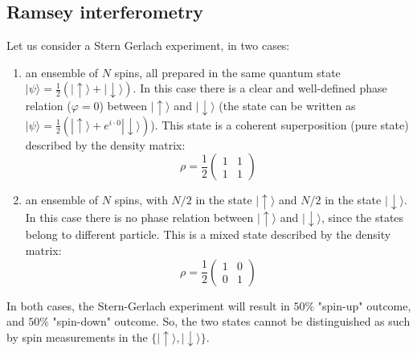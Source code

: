 \documentclass[a4paper,11pt]{article}
\newcommand{\ket}[1]{| #1 \rangle}
\begin{document}
\subsection {Ramsey interferometry}
Let us consider a Stern Gerlach experiment, in two cases:
\begin{enumerate}
    \item an ensemble of $N$ spins, all prepared in the same quantum state $\ket{\psi} = \frac{1}{2} (\ket{\uparrow}+\ket{\downarrow})$. In this case there is a clear and well-defined phase relation ($\varphi = 0$) between $\ket{\uparrow}$ and $\ket{\downarrow}$ (the state can be written as $\ket{\psi} = \frac{1}{2} (\ket{\uparrow}+ e^{i \cdot 0}\ket{\downarrow})$). This state is a coherent superposition (pure state) described by the density matrix:
    \begin{equation}
        \rho = \frac{1}{2}\left(\begin{array}{cc}
1 & 1\\
1 & 1\end{array} \right)
    \end{equation}    
    \item an ensemble of $N$ spins, with $N/2$ in the state $\ket{\uparrow}$ and $N/2$ in the state $\ket{\downarrow}$. In this case there is no phase relation between $\ket{\uparrow}$ and $\ket{\downarrow}$, since the states belong to different particle. This is a mixed state described by the density matrix:
    \begin{equation}
        \rho = \frac{1}{2}\left(\begin{array}{cc}
1 & 0\\
0 & 1\end{array} \right)
    \end{equation}    
\end{enumerate}
In both cases, the Stern-Gerlach experiment will result in $50\%$ "spin-up" outcome, and $50\%$ "spin-down" outcome. So, the two states cannot be distinguished as such by spin measurements in the $\lbrace \ket{\uparrow}, \ket{\downarrow} \rbrace$.
\end{document}
